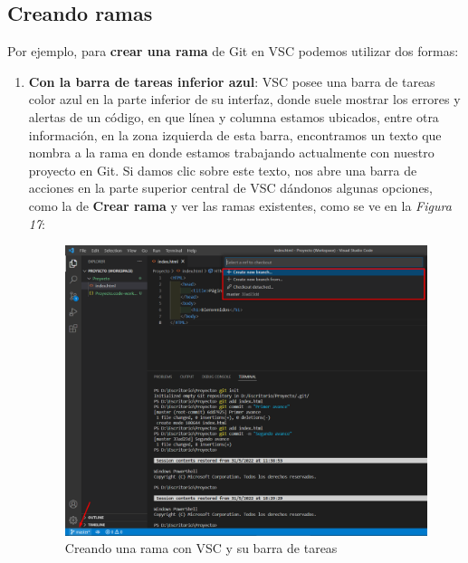 \subsection{Creando ramas}
\hspace{0.55cm}Por ejemplo, para \textbf{crear una rama} de Git en VSC podemos utilizar dos formas:
\begin{enumerate}
    \item \textbf{Con la barra de tareas inferior azul}: VSC posee una barra de tareas color azul en la parte inferior de su interfaz, donde suele mostrar los errores y alertas de un código, en que línea y columna estamos ubicados, entre otra información, en la zona izquierda de esta barra, encontramos un texto que nombra a la rama en donde estamos trabajando actualmente con nuestro proyecto en Git. Si damos clic sobre este texto, nos abre una barra de acciones en la parte superior central de VSC dándonos algunas opciones, como la de \textbf{Crear rama} y ver las ramas existentes, como se ve en la \textit{Figura 17}:
    \begin{figure}[H]
        \begin{center}
            \caption{Creando una rama con VSC y su barra de tareas}
            \label{fig: 17}
            \includegraphics[width=14cm]{capturas/creando_b1.png}
        \end{center}
    \end{figure}
    

\end{enumerate}
